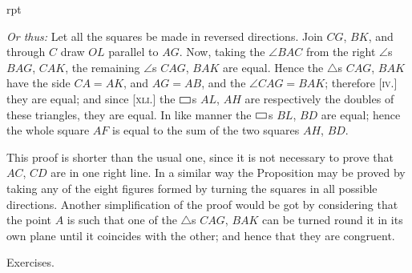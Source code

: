 \documentclass[oneside]{book}
\newcounter{wrapwidth}
\newcommand\pgram{
	\setlength{\unitlength}{1pt}
	\begin{picture}(11,8)(0,0)
	\linethickness{0.5pt}
	\put(1,0){\line(1,0){9}}
	\put(1,0){\line(0,1){5}}
	\put(1,5){\line(1,0){9}}
	\put(10,0){\line(0,1){5}}
	\end{picture}}
\newcommand\exhead[1]{
\Needspace*{5\baselineskip}\begin{center}
\textsf{#1}
\end{center}
}
\newcommand\imgflow[3]{
\setcounter{wrapwidth}{#1}

\begin{wrapfigure}[#2]{r}{\value{wrapwidth}pt}
\begin{center}
\vspace{-0.3in}

\end{center}
\end{wrapfigure}
}
\begin{document}
\imgflow{115}{15}{f069}

\begin{footnotesize}

\emph{Or thus:} Let all the squares be made in reversed directions.
Join $CG$, $BK$, and through $C$ draw $OL$
parallel to $AG$. Now, taking the $\angle BAC$
from the right $\angle$s $BAG$, $CAK$, the remaining
$\angle$s $CAG$, $BAK$ are equal.
Hence the $\triangle$s $CAG$, $BAK$ have the side
$CA = AK$, and $AG = AB$, and the
$\angle CAG= BAK$; therefore [\textsc{iv}.] they are
equal; and since [\textsc{xli}.] the $\pgram$s $AL$, $AH$
are respectively the doubles of these
triangles, they are equal. In like manner
the $\pgram$s  $BL$, $BD$ are equal; hence
the whole square $AF$ is equal to the
sum of the two squares $AH$, $BD$.

This proof is shorter than the usual
one, since it is not necessary to prove
that $AC$, $CD$ are in one right line. In a similar way the
Proposition may be proved by taking any of the eight figures
formed by turning the squares in all possible directions. Another
simplification of the proof would be got by considering that the
point $A$ is such that one of the $\triangle$s $CAG$, $BAK$ can be turned
round it in its own plane until it coincides with the other; and
hence that they are congruent.
\par\end{footnotesize}




\exhead{Exercises.}
\end{document}
